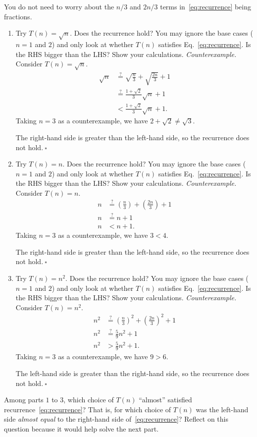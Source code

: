 You do not need to worry about the $n/3$ and $2n/3$ terms in~\eqref{eq:recurrence} being fractions. 

\begin{enumerate}
\item Try $T(n) = \sqrt{n}$. Does the recurrence hold? You may ignore the base cases ($n=1$ and $2$) and only look at whether $T(n)$ satisfies Eq.~\eqref{eq:recurrence}. Is the RHS bigger than the LHS? Show your calculations.
\textit{Counterexample. } Consider $T(n)=\sqrt{n}$.
\begin{align*}
\sqrt{n}&\stackrel{?}{=}\sqrt{\frac{n}{3}}+\sqrt{\frac{2n}{3}}+1\\
&\stackrel{?}{=}\frac{1+\sqrt{2}}{3}\sqrt{n}+1\\
&<\frac{1+\sqrt{2}}{3}\sqrt{n}+1.
\end{align*}
Taking $n=3$ as a counterexample, we have $2+\sqrt{2}\neq\sqrt{3}$.

The right-hand side is greater than the left-hand side, so the recurrence does not hold.$~\square$
\item Try $T(n) = n$. Does the recurrence hold? You may ignore the base cases ($n=1$ and $2$) and only look at whether $T(n)$ satisfies Eq.~\eqref{eq:recurrence}. Is the RHS bigger than the LHS? Show your calculations.
\textit{Counterexample. } Consider $T(n)=n$.
\begin{align*}
n&\stackrel{?}{=}\left(\frac{n}{3}\right)+\left(\frac{2n}{3}\right)+1\\
n&\stackrel{?}{=}n+1\\
n&<n+1.
\end{align*}
Taking $n=3$ as a counterexample, we have $3<4$.

The right-hand side is greater than the left-hand side, so the recurrence does not hold.$~\square$
\item Try $T(n) = n^2$. Does the recurrence hold? You may ignore the base cases ($n=1$ and $2$) and only look at whether $T(n)$ satisfies Eq.~\eqref{eq:recurrence}. Is the RHS bigger than the LHS? Show your calculations.
\textit{Counterexample. } Consider $T(n)=n^2$.
\begin{align*}
n^2&\stackrel{?}{=}\left(\frac{n}{3}\right)^2+\left(\frac{2n}{3}\right)^2+1\\
n^2&\stackrel{?}{=}\frac{5}{9}n^2+1\\
n^2&>\frac{5}{9}n^2+1.
\end{align*}
Taking $n=3$ as a counterexample, we have $9>6$.

The left-hand side is greater than the right-hand side, so the recurrence does not hold.$~\square$
\end{enumerate}
Among parts $1$ to $3$, which choice of $T(n)$ ``almost'' satisfied recurrence~\eqref{eq:recurrence}? That is, for which choice of $T(n)$ was the left-hand side \emph{almost equal} to the right-hand side of~\eqref{eq:recurrence}? Reflect on this question because it would help solve the next part.\\

